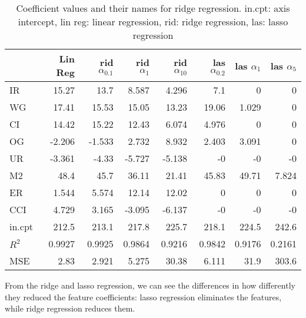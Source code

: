 \documentclass{article}
\begin{document}
\begin{table}
      \caption{Coefficient values and their names for ridge regression. in.cpt: axis intercept, lin reg: linear regression, rid: ridge regression, las: lasso regression}
      \label{tab:ridge_coefficients}
      \begin{tabular}{lrrrrrrr}
            \toprule
                   & Lin Reg & rid $\alpha_{0.1}$ & rid $\alpha_{1}$ & rid $\alpha_{10}$ & las $\alpha_{0.2}$ & las $\alpha_{1}$ & las $\alpha_{5}$ \\
            \midrule
            IR     & 15.27   & 13.7               & 8.587            & 4.296             & 7.1                & 0                & 0                \\
            WG     & 17.41   & 15.53              & 15.05            & 13.23             & 19.06              & 1.029            & 0                \\
            CI     & 14.42   & 15.22              & 12.43            & 6.074             & 4.976              & 0                & 0                \\
            OG     & -2.206  & -1.533             & 2.732            & 8.932             & 2.403              & 3.091            & 0                \\
            UR     & -3.361  & -4.33              & -5.727           & -5.138            & -0                 & -0               & -0               \\
            M2     & 48.4    & 45.7               & 36.11            & 21.41             & 45.83              & 49.71            & 7.824            \\
            ER     & 1.544   & 5.574              & 12.14            & 12.02             & 0                  & 0                & 0                \\
            CCI    & 4.729   & 3.165              & -3.095           & -6.137            & -0                 & -0               & -0               \\
            in.cpt & 212.5   & 213.1              & 217.8            & 225.7             & 218.1              & 224.5            & 242.6            \\
            $R^2$  & 0.9927  & 0.9925             & 0.9864           & 0.9216            & 0.9842             & 0.9176           & 0.2161           \\
            MSE    & 2.83    & 2.921              & 5.275            & 30.38             & 6.111              & 31.9             & 303.6            \\
            \bottomrule
      \end{tabular}
\end{table}
From the ridge and lasso regression,
we can see the differences in how differently they reduced the feature coefficients:
lasso regression eliminates the features, while ridge regression reduces them.
\end{document}
